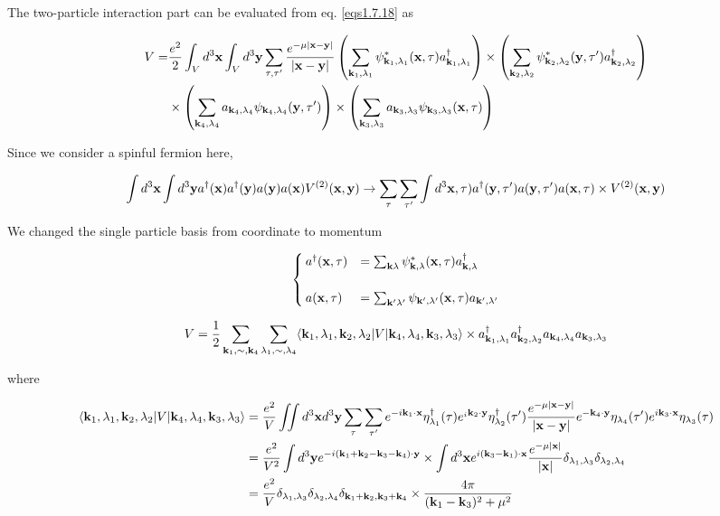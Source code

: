 The two-particle interaction part can be evaluated from eq. \eqref{eqs1.7.18} as

\[\begin{split}
V=&\frac{e^2}{2}\int_V d^3{\bf x}\int_V d^3{\bf y}\sum_{\tau,\tau'}\frac{e^{-\mu|\bf x-y|}}{|\bf x-y|}\left( \sum_{{\bf k}_1,\lambda_1}\psi^*_{{\bf k}_1,\lambda_1}({\bf x},\tau)a_{{\bf k}_1,\lambda_1}^\dagger\right)\times\left( \sum_{{\bf k}_2,\lambda_2}\psi^*_{{\bf k}_2,\lambda_2}({\bf y},\tau')a_{{\bf k}_2,\lambda_2}^\dagger\right)\\
&\times\left( \sum_{{\bf k}_4,\lambda_4}a_{{\bf k}_4,\lambda_4}\psi_{{\bf k}_4,\lambda_4}({\bf y},\tau')\right)\times\left( \sum_{{\bf k}_3,\lambda_3}a_{{\bf k}_3,\lambda_3}\psi_{{\bf k}_3,\lambda_3}({\bf x},\tau)\right)
\end{split}\]

Since we consider a spinful fermion here, 

\[\int d^3{\bf x}\int d^3{\bf y}a^\dagger({\bf x})a^\dagger({\bf y})a({\bf y})a({\bf x})V^{(2)}({\bf x,y})\to\sum_\tau \sum_{\tau'}\int d^3{\bf x},\tau)a^\dagger({\bf y},\tau')a({\bf y},\tau')a({\bf x},\tau)\times V^{(2)}(\bf x,y)\]

We changed the single particle basis from coordinate to momentum

\[\begin{cases}
a^\dagger({\bf x},\tau)&=\sum_{{\bf k}\lambda}\psi_{{\bf k},\lambda}^*({\bf x},\tau)a^\dagger_{{\bf k},\lambda}\\
\ & \\
a({\bf x},\tau)&=\sum_{{\bf k'}\lambda'}\psi_{{\bf k'},\lambda'}({\bf x},\tau)a_{{\bf k'},\lambda'}
\end{cases}\]

\[V=\frac{1}{2}\sum_{{\bf k}_1,\sim,{\bf k}_4}\sum_{\lambda_1,\sim,\lambda_4}\langle{\bf k}_1,\lambda_1,{\bf k}_2,\lambda_2|V|{\bf k}_4,\lambda_4,{\bf k}_3,\lambda_3\rangle\times a^\dagger_{{\bf k}_1,\lambda_1}a^\dagger_{{\bf k}_2,\lambda_2}a_{{\bf k}_4,\lambda_4}a_{{\bf k}_3,\lambda_3}\]

where

\[\begin{split}
\langle{\bf k}_1,\lambda_1,{\bf k}_2,\lambda_2|V|{\bf k}_4,\lambda_4,{\bf k}_3,\lambda_3\rangle &=\frac{e^2}{V}\iint d^3{\bf x}d^3{\bf y}\sum_{\tau}\sum_{\tau'}e^{-i{\bf k}_1\cdot\bf x}\eta_{\lambda_1}^\dagger(\tau)e^{_i{\bf k}_2\cdot\bf y}\eta_{\lambda_2}^\dagger(\tau')\frac{e^{-\mu|\bf x-y|}}{|\bf x-y|}e^{-{\bf k}_4\cdot\bf y}\eta_{\lambda_4}(\tau')e^{i{\bf k}_3\cdot\bf x}\eta_{\lambda_3}(\tau)\\
&=\frac{e^2}{V^2}\int d^3{\bf y}e^{-i({\bf k}_1 + {\bf k}_2 - {\bf k}_3 - {\bf k}_4)\cdot\bf y}\times\int d^3{\bf x}e^{i({\bf k}_3-{\bf k}_1)\cdot\bf x}\frac{e^{-\mu|\bf x|}}{|\bf x|}\delta_{\lambda_1,\lambda_3}\delta_{\lambda_2,\lambda_4}\\
&=\frac{e^2}{V}\delta_{\lambda_1,\lambda_3}\delta_{\lambda_2,\lambda_4}\delta_{{\bf k}_1 + {\bf k}_2,{\bf k}_3 + {\bf k}_4}\times\frac{4\pi}{({\bf k}_1 - {\bf k}_3)^2+\mu^2}
\end{split}\]

